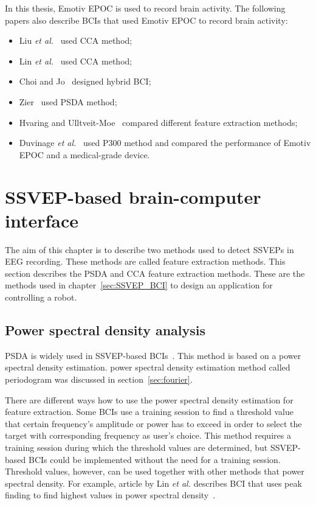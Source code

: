 In this thesis, Emotiv EPOC is used to record brain activity. The following papers also describe \glspl{BCI} that used Emotiv EPOC to record brain activity:
\begin{itemize}
	\item Liu \textit{et al.}~\cite{emotiv_11hz} used \gls{CCA} method;
	\item Lin \textit{et al.}~\cite{emotiv_walking} used \gls{CCA} method;
	\item Choi and Jo~\cite{emotiv_hybrid} designed hybrid \gls{BCI};
	\item Zier~\cite{emotiv_psda} used \gls{PSDA} method;
	\item Hvaring and Ulltveit-Moe~\cite{emotiv_comparison} compared different \gls{feature extraction} methods;
	\item Duvinage \textit{et al.}~\cite{emotiv_p300_comp} used P300 method and compared the performance of Emotiv EPOC and a medical-grade device.
\end{itemize}


\section{SSVEP-based brain-computer interface}
\label{sec:SSVEP_detection}
The aim of this chapter is to describe two methods used to detect \glspl{SSVEP} in \gls{EEG} recording. These methods are called \gls{feature extraction} methods. This section describes the \gls{PSDA} and \gls{CCA} \gls{feature extraction} methods. These are the methods used in chapter~\ref{sec:SSVEP_BCI} to design an application for controlling a robot. %

\subsection{Power spectral density analysis}

\Gls{PSDA} is widely used in \gls{SSVEP}-based \glspl{BCI}~\cite{bin2009cca}. This method is based on a \gls{power spectral density} estimation. \Gls{power spectral density} estimation method called \gls{periodogram} was discussed in section~\ref{sec:fourier}.

There are different ways how to use the \gls{power spectral density} estimation for \gls{feature extraction}. Some \glspl{BCI} use a training session to find a threshold value that certain frequency's amplitude or power has to exceed in order to select the \gls{target} with corresponding frequency as user's choice. This method requires a training session during which the threshold values are determined, but \gls{SSVEP}-based \glspl{BCI} could be implemented without the need for a training session. Threshold values, however, can be used together with other methods that \gls{power spectral density}. For example, article by Lin \textit{et al.} describes \gls{BCI} that uses peak finding to find highest values in \gls{power spectral density}~\cite{cca_lin}.

